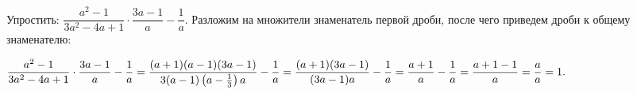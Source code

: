  Упростить: $\dfrac{a^2-1}{3a^2-4a+1}\cdot\dfrac{3a-1}{a}-\dfrac{1}{a}.$
\Solution Разложим на множители знаменатель первой дроби, после чего приведем дроби к общему знаменателю:
\begin{center}
$\dfrac{a^2-1}{3a^2-4a+1}\cdot\dfrac{3a-1}{a}-\dfrac{1}{a}\hm=\dfrac{(a+1)(a-1)(3a-1)}{3(a-1)\left(a-\frac{1}{3}\right)a}-\dfrac{1}{a}\hm=\dfrac{(a+1)(3a-1)}{(3a-1)a}-\dfrac{1}{a}\hm=\dfrac{a+1}{a}-\dfrac{1}{a}\hm=\dfrac{a+1-1}{a}\hm=\dfrac{a}{a}\hm=1.$
\end{center}
